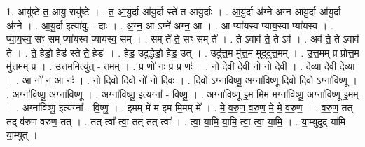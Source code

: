 \documentclass[17pt]{extarticle}
\begin{document}
1. आयु॑ष्टे त॒ आयु॒ रायु॑ष्टे । . त॒ आ॒यु॒र्दा आ॑यु॒र्दा स्ते॑ त आयु॒र्दाः । . आ॒यु॒र्दा अ॑ग्ने अग्न आयु॒र्दा आ॑यु॒र्दा अ॑ग्ने । . आ॒यु॒र्दा इत्या॑युः - दाः । . अ॒ग्न॒ आ ऽग्ने॑ अग्न॒ आ । . आ प्या॑यस्व प्याय॒स्वा प्या॑यस्व । . प्या॒य॒स्व॒ सꣳ सम् प्या॑यस्व प्यायस्व॒ सम् । . सम् ते॑ ते॒ सꣳ सम् ते᳚ । . ते ऽवाव॑ ते॒ ते ऽव॑ । . अव॑ ते॒ ते ऽवाव॑ ते । . ते॒ हेडो॒ हेड॑ स्ते ते॒ हेडः॑ । . हेड॒ उदुद्धेडो॒ हेड॒ उत् । . उदु॑त्त॒म मु॑त्त॒म मुदुदु॑त्त॒मम् । . उ॒त्त॒मम् प्र प्रोत्त॒म मु॑त्त॒मम् प्र । . उ॒त्त॒ममित्यु॑त् - त॒मम् । . प्र णो॑ नः॒ प्र प्र णः॑ । . नो॒ दे॒वी दे॒वी नो॑ नो दे॒वी । . दे॒व्या दे॒वी दे॒व्या । . आ नो॑ न॒ आ नः॑ । . नो॒ दि॒वो दि॒वो नो॑ नो दि॒वः । . दि॒वो ऽग्ना॑विष्णू॒ अग्ना॑विष्णू दि॒वो दि॒वो ऽग्ना॑विष्णू । . अग्ना॑विष्णू॒ अग्ना॑विष्णू । . अग्ना॑विष्णू॒ इत्यग्ना᳚ - वि॒ष्णू॒ । . अग्ना॑विष्णू इ॒म मि॒म मग्ना॑विष्णू॒ अग्ना॑विष्णू इ॒मम् । . अग्ना॑विष्णू॒ इत्यग्ना᳚ - वि॒ष्णू॒ । . इ॒मम् मे॑ म इ॒म मि॒मम् मे᳚ । . मे॒ व॒रु॒ण॒ व॒रु॒ण॒ मे॒ मे॒ व॒रु॒ण॒ । . व॒रु॒ण॒ तत् तद् व॑रुण वरुण॒ तत् । . तत् त्वा᳚ त्वा॒ तत् तत् त्वा᳚ । . त्वा॒ या॒मि॒ या॒मि॒ त्वा॒ त्वा॒ या॒मि॒ । . या॒म्युदुद् या॑मि या॒म्युत् । \newline
\end{document}
